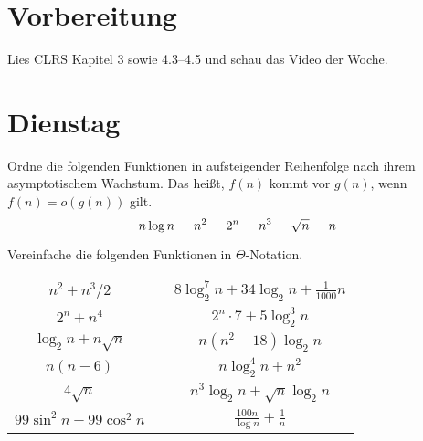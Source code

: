 \documentclass{uebung_cs}
\begin{document}
\section*{Vorbereitung}
Lies CLRS Kapitel 3 sowie 4.3--4.5 und schau das Video der Woche.

\section*{Dienstag}
\begin{aufgabe}\label{tue-first}\mbox{}
	Ordne die folgenden Funktionen in aufsteigender Reihenfolge nach ihrem asymptotischem Wachstum.
	Das heißt, $f(n)$ kommt vor $g(n)$, wenn $f(n) = o(g(n))$ gilt.
	\[n \log n\hspace*{15pt} n^2\hspace*{15pt} 2^n\hspace*{15pt} n^3\hspace*{15pt} \sqrt{n}\hspace*{15pt} n\]
\end{aufgabe}

\begin{aufgabe}
	Vereinfache die folgenden Funktionen in $\Theta$-Notation.
	\begin{center}
		\begin{tabular}{ccc}
			$n^2 + n^3/2$
			&&
			$8\log_2^7 n + 34\log_2 n + \frac{1}{1000}n$\\
			$2^n + n^4$&&
			$2^n\cdot 7 + 5\log_2^3 n$\\
			$\log_2n + n\sqrt{n}$&&
			$n(n^2 - 18)\log_2 n$\\
			$n(n-6)$&&
			$n\log_2^4 n + n^2$\\
			$4\sqrt{n}$&&
			$n^3 \log_2 n + \sqrt{n}\log_2 n$\\
			$99\sin^2 n + 99\cos^2 n$&& $\frac{100n}{\log n}+\frac{1}{n}$
		\end{tabular}
	\end{center}
	
\end{aufgabe}
\end{document}
